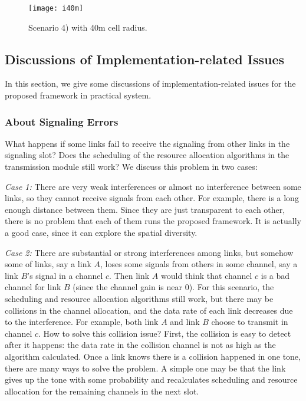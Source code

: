 \documentclass[conference]{IEEEtran}
\begin{document}
\begin{figure}[htb]
\centering
\texttt{[image: i40m]}
\caption{Scenario 4) with 40m cell radius.}
\label{fig:simulation_40}
\end{figure}



\subsection{Discussions of Implementation-related Issues}
In this section, we give some discussions of implementation-related issues for the proposed framework in practical system.
\subsubsection{About Signaling Errors}
What happens if some links fail to receive the signaling from other links in the signaling slot? Does the scheduling of the resource allocation algorithms in the transmission module still work?
We discuss this problem in two cases:

\emph{Case 1:} There are  very weak interferences or almost no interference between some links, so they cannot receive signals from each other. For example, there is a long enough distance between them. Since they are just transparent to each other, there is no problem that each of them runs the proposed framework. It is actually a good case, since it can explore the spatial diversity.

\emph{Case 2:} There are substantial or strong interferences among links, but somehow some of links, say a link $A$, loses some signals from others in some channel, say a link $B$'s signal in a channel $c$. Then link $A$ would think that channel $c$ is a bad channel for link $B$ (since the channel gain is near 0). For this scenario, the scheduling and resource allocation algorithms still work, but there may be collisions in the channel allocation, and the data rate of each link decreases due to the interference. For example, both link $A$ and link $B$ choose to transmit in channel $c$. How to solve this collision issue? First, the collision is easy to detect after it happens: the data rate in the collision channel is not as high as the algorithm calculated. Once a link knows there is a collision happened in one tone, there are many ways to solve the problem. A simple one may be that the link gives up the tone with some probability and recalculates scheduling and resource allocation for the remaining channels in the next slot.
\end{document}
